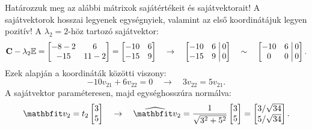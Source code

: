 \documentclass[exercise]{math-standalone}
\begin{document}
\begin{exercise}{%
    Határozzuk meg az alábbi mátrixok sajátértékeit és sajátvektorait!
    A sajátvektorok hosszai legyenek egységnyiek, valamint az első koordinátájuk
    legyen pozitív!
  }
{  A $\lambda_2 = 2$-höz tartozó sajátvektor:
  \[
    \mathbf{C} - \lambda_2 {\mathbb{E}} = \begin{bmatrix}
      -8 - 2 & 6      \\
      -15    & 11 - 2
    \end{bmatrix} = \begin{bmatrix}
      -10 & 6 \\
      -15 & 9
    \end{bmatrix}
    \quad \rightarrow \quad
    \left[\begin{matrix}
        -10 & 6 \\
        -15 & 9
      \end{matrix}\right.\left|\begin{matrix}
        \,0 \\ \,0
      \end{matrix}\right]
    \quad \sim \quad
    \left[\begin{matrix}
        -10 & 6 \\
        0   & 0
      \end{matrix}\right.\left|\begin{matrix}
        \,0 \\ \,0
      \end{matrix}\right]
    \text{.}
  \]
  Ezek alapján a koordináták közötti viszony:
  \[
    -10v_{21} + 6v_{22} = 0
    \quad \rightarrow \quad
    3v_{22} = 5v_{21}
    \text{.}
  \]
  A sajátvektor paraméteresen, majd egységhosszúra normálva:
  \[
    \rvec v_2 = t_2 \begin{bmatrix}
      3 \\ 5
    \end{bmatrix}
    \quad
    \rightarrow
    \quad
    \uvec v_2 = \frac{1}{\sqrt{3^2 + 5^2}}\begin{bmatrix}
      3 \\ 5
    \end{bmatrix} = \begin{bmatrix}
      3 / \sqrt{34} \\
      5 / \sqrt{34}
    \end{bmatrix}
    \text{.}
  \]
  }
\end{exercise}
\end{document}
